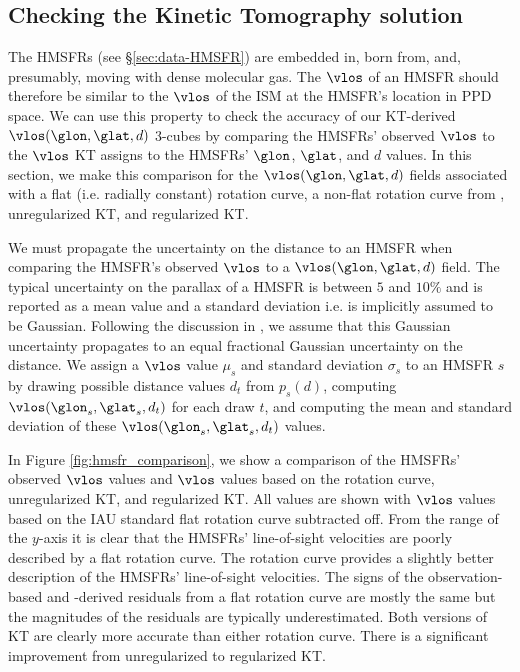 \subsection{Checking the Kinetic Tomography solution}
\label{sec:KT-validation}
The \Reid{} HMSFRs (see \S \ref{sec:data-HMSFR}) are embedded in, born from, and, presumably, moving with dense molecular gas.
The $\vlos$ of an HMSFR should therefore be similar to the $\vlos$ of the ISM at the HMSFR's location in PPD space.
We can use this property to check the accuracy of our KT-derived $\vlos(\glon, \glat, d)$ 3-cubes by comparing the HMSFRs' observed $\vlos$ to the $\vlos$ KT assigns to the HMSFRs' $\glon$, $\glat$, and $d$ values. 
In this section, we make this comparison for the $\vlos(\glon, \glat, d)$ fields associated with a flat (i.e. radially constant) rotation curve, a non-flat rotation curve from \citet{Clemens:1985dp}, unregularized KT, and regularized KT. 

We must propagate the uncertainty on the distance to an HMSFR when comparing the HMSFR's observed $\vlos$ to a $\vlos(\glon, \glat, d)$ field.
The typical uncertainty on the parallax of a \Reid{} HMSFR is between $5$ and $10\%$ and is reported as a mean value and a standard deviation i.e. is implicitly assumed to be Gaussian. 
Following the discussion in \citet{2009ApJ...704.1704B}, we assume that this Gaussian uncertainty propagates to an equal fractional Gaussian uncertainty on the distance.
We assign a $\vlos$ value $\mu_{s}$ and standard deviation $\sigma_{s}$ to an HMSFR $s$ by drawing possible distance values $d_t$ from $p_s(d)$, computing $\vlos(\glon_{s}, \glat_{s}, d_t)$ for each draw $t$, and computing the mean and standard deviation of these $\vlos(\glon_{s}, \glat_{s}, d_t)$ values. 

In Figure \ref{fig:hmsfr_comparison}, we show a comparison of the HMSFRs' observed $\vlos$ values and $\vlos$ values based on the \citet{Clemens:1985dp} rotation curve, unregularized KT, and regularized KT.
All values are shown with $\vlos$ values based on the IAU standard flat rotation curve subtracted off. 
From the range of the $y$-axis it is clear that the HMSFRs' line-of-sight velocities are  poorly described by a flat rotation curve.
The \citet{Clemens:1985dp} rotation curve provides a slightly better description of the HMSFRs' line-of-sight velocities.
The signs of the observation-based and \citet{Clemens:1985dp}-derived residuals from a flat rotation curve are mostly the same but the magnitudes of the residuals are typically underestimated.
Both versions of KT are clearly more accurate than either rotation curve.
There is a significant improvement from unregularized to regularized KT.

